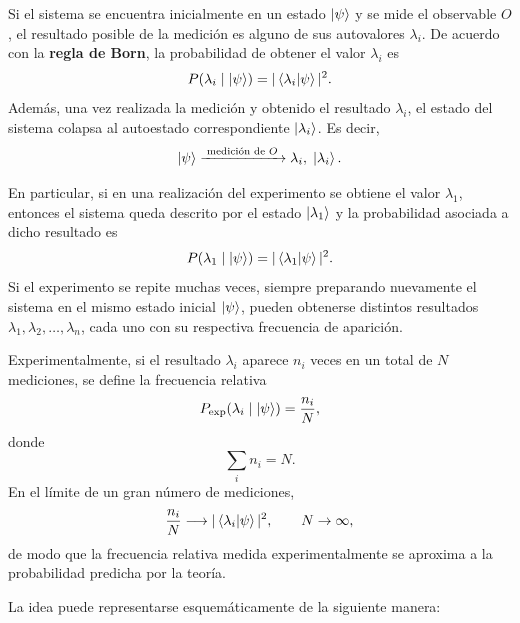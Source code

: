 \documentclass[12pt,a4paper]{article}
\theoremstyle{definition}
\theoremstyle{plain}
\theoremstyle{remark}
\begin{document}
Si el sistema se encuentra inicialmente en un estado $\ket{\psi}$ y se mide el observable $O$, el resultado posible de la medición es alguno de sus autovalores $\lambda_i$. De acuerdo con la \textbf{regla de Born}, la probabilidad de obtener el valor $\lambda_i$ es
\begin{equation*}
    P(\lambda_i \mid \ket{\psi}) = |\braket{\lambda_i|\psi}|^2.
\end{equation*}
Además, una vez realizada la medición y obtenido el resultado $\lambda_i$, el estado del sistema colapsa al autoestado correspondiente $\ket{\lambda_i}$. Es decir,
\begin{equation*}
    \ket{\psi}
    \xrightarrow{\;\text{medición de }O\;}
    \lambda_i,\;\ket{\lambda_i}.
\end{equation*}

En particular, si en una realización del experimento se obtiene el valor $\lambda_1$, entonces el sistema queda descrito por el estado $\ket{\lambda_1}$ y la probabilidad asociada a dicho resultado es
\begin{equation*}
    P(\lambda_1 \mid \ket{\psi}) = |\braket{\lambda_1|\psi}|^2.
\end{equation*}
Si el experimento se repite muchas veces, siempre preparando nuevamente el sistema en el mismo estado inicial $\ket{\psi}$, pueden obtenerse distintos resultados $\lambda_1,\lambda_2,\dots,\lambda_n$, cada uno con su respectiva frecuencia de aparición.

Experimentalmente, si el resultado $\lambda_i$ aparece $n_i$ veces en un total de $N$ mediciones, se define la frecuencia relativa
\begin{equation*}
    P_{\mathrm{exp}}(\lambda_i \mid \ket{\psi}) = \frac{n_i}{N},
\end{equation*}
donde
\begin{equation*}
    \sum_i n_i = N.
\end{equation*}
En el límite de un gran número de mediciones,
\begin{equation*}
    \frac{n_i}{N} \longrightarrow |\braket{\lambda_i|\psi}|^2,
    \qquad N\to\infty,
\end{equation*}
de modo que la frecuencia relativa medida experimentalmente se aproxima a la probabilidad predicha por la teoría.

La idea puede representarse esquemáticamente de la siguiente manera:
\end{document}
